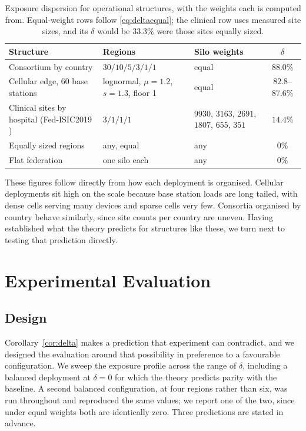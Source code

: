 \documentclass[acmsmall,screen,review,anonymous]{acmart}
\theoremstyle{acmdefinition}%
\begin{document}
\begin{table}[t]
\caption{Exposure dispersion for operational structures, with the weights each is computed from. Equal-weight rows follow \eqref{eq:deltaequal}; the clinical row uses measured site sizes, and its $\delta$ would be $33.3\%$ were those sites equally sized.}
\label{tab:realdelta}
\centering
\footnotesize
\setlength{\tabcolsep}{4pt}
\begin{tabular}{@{}p{}p{}p{}c@{}}
\toprule
Structure & Regions & Silo weights & $\delta$ \\
\midrule
Consortium by country & $30/10/5/3/1/1$ & equal & $88.0\%$ \\
Cellular edge, 60 base stations \cite{wang2017cellular} & lognormal, $\mu{=}1.2$, $s{=}1.3$, floor 1 & equal & $82.8$--$87.6\%$ \\
Clinical sites by hospital (Fed-ISIC2019 \cite{terrail2022flamby}) & $3/1/1/1$ & $9930$, $3163$, $2691$, $1807$, $655$, $351$ & $14.4\%$ \\
Equally sized regions & any, equal & any & $0\%$ \\
Flat federation & one silo each & any & $0\%$ \\
\bottomrule
\end{tabular}
\end{table}

These figures follow directly from how each deployment is organised. Cellular
deployments sit high on the scale because base station loads are long tailed,
with dense cells serving many devices and sparse cells very few. Consortia
organised by country behave similarly, since site counts per country are
uneven. Having established what the theory predicts for structures like these,
we turn next to testing that prediction directly.


\section{Experimental Evaluation}
\label{sec:eval}

\subsection{Design}

Corollary~\ref{cor:delta} makes a prediction that experiment can contradict, and
we designed the evaluation around that possibility in preference to a favourable
configuration. We sweep the exposure profile across the range of $\delta$,
including a balanced deployment at $\delta = 0$ for which the theory predicts
parity with the baseline. A second balanced configuration, at four regions rather
than six, was run throughout and reproduced the same values; we report one of the
two, since under equal weights both are identically zero. Three predictions are stated in advance.
\end{document}
